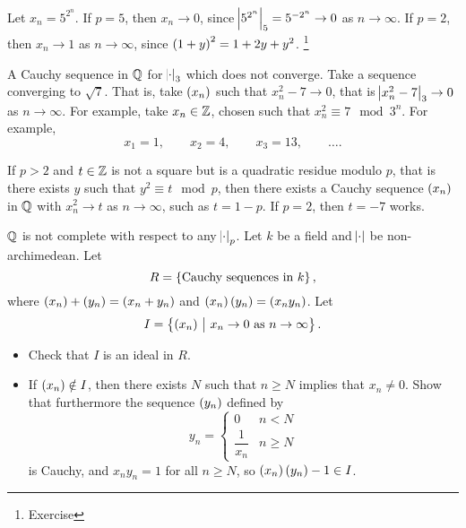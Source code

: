 \begin{example}
Let $ x_n = 5^{2^n} $. If $ p = 5 $, then $ x_n \to 0 $, since $ \abs{5^{2^n}}_5 = 5^{-2^n} \to 0 $ as $ n \to \infty $. If $ p = 2 $, then $ x_n \to 1 $ as $ n \to \infty $, since $ \br{1 + y}^2 = 1 + 2y + y^2 $. \footnote{Exercise}
\end{example}

\begin{example*}
A Cauchy sequence in $ \mathbb{Q} $ for $ \abs{\cdot}_3 $ which does not converge. Take a sequence converging to $ \sqrt{7} $. That is, take $ \br{x_n} $ such that $ x_n^2 - 7 \to 0 $, that is $ \abs{x_n^2 - 7}_3 \to 0 $ as $ n \to \infty $. For example, take $ x_n \in \mathbb{Z} $, chosen such that $ x_n^2 \equiv 7 \mod 3^n $. For example,
$$ x_1 = 1, \qquad x_2 = 4, \qquad x_3 = 13, \qquad \dots. $$
\end{example*}

\begin{exercise}
If $ p > 2 $ and $ t \in \mathbb{Z} $ is not a square but is a quadratic residue modulo $ p $, that is there exists $ y $ such that $ y^2 \equiv t \mod p $, then there exists a Cauchy sequence $ \br{x_n} $ in $ \mathbb{Q} $ with $ x_n^2 \to t $ as $ n \to \infty $, such as $ t = 1 - p $. If $ p = 2 $, then $ t = -7 $ works.
\end{exercise}


$ \mathbb{Q} $ is not complete with respect to any $ \abs{\cdot}_p $. Let $ k $ be a field and $ \abs{\cdot} $ be non-archimedean. Let
$$ R = \cbr{\text{Cauchy sequences in} \ k}, $$
where $ \br{x_n} + \br{y_n} = \br{x_n + y_n} $ and $ \br{x_n}\br{y_n} = \br{x_ny_n} $. Let
$$ I = \cbr{\br{x_n} \st x_n \to 0 \ \text{as} \ n \to \infty}. $$

\begin{exercise*}
\hfill
\begin{itemize}
\item Check that $ I $ is an ideal in $ R $.
\item If $ \br{x_n} \notin I $, then there exists $ N $ such that $ n \ge N $ implies that $ x_n \ne 0 $. Show that furthermore the sequence $ \br{y_n} $ defined by
$$ y_n =
\begin{cases}
0 & n < N \\
\dfrac{1}{x_n} & n \ge N
\end{cases}
$$
is Cauchy, and $ x_ny_n = 1 $ for all $ n \ge N $, so $ \br{x_n}\br{y_n} - 1 \in I $.
\end{itemize}
\end{exercise*}

